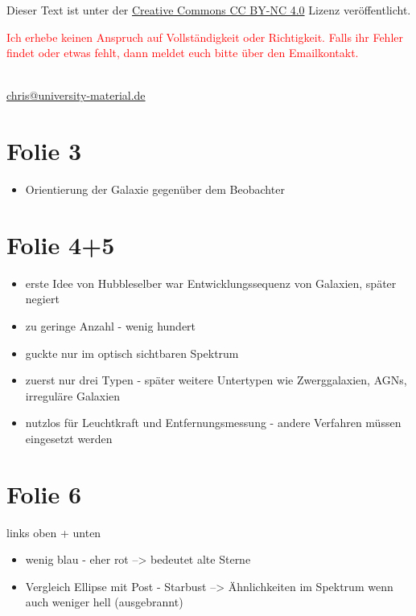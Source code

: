 




Dieser Text ist unter der
\href{http://creativecommons.org/licenses/by-nc/4.0/}{Creative Commons CC BY-NC 4.0}
Lizenz veröffentlicht.

\textcolor{red}{%
    Ich erhebe keinen Anspruch auf Vollständigkeit oder Richtigkeit. Falls ihr
    Fehler findet oder etwas fehlt, dann meldet euch bitte über den
    Emailkontakt.
}

\hfill\\

\href{mailto:chris@university-material.de}{chris@university-material.de}


\section{Folie 3}


\begin{itemize}
\item Orientierung der Galaxie gegenüber dem Beobachter
\end{itemize}


\section{Folie 4+5}

\begin{itemize}
\item erste Idee von Hubbleselber war Entwicklungssequenz von Galaxien, später negiert
\item zu geringe Anzahl - wenig hundert
\item guckte nur im optisch sichtbaren Spektrum
\item zuerst nur drei Typen - später weitere Untertypen wie Zwerggalaxien, AGNs, irreguläre Galaxien
\item nutzlos für Leuchtkraft und Entfernungsmessung - andere Verfahren müssen eingesetzt werden
\end{itemize}

\newpage


\section{Folie 6}

links oben + unten

\begin{itemize}
\item wenig blau - eher rot --> bedeutet alte Sterne
\item Vergleich  Ellipse mit Post - Starbust --> Ähnlichkeiten im Spektrum wenn auch weniger hell (ausgebrannt)
\end{itemize}


